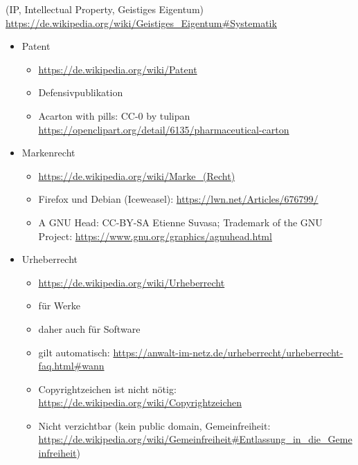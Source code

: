 {
	(IP, Intellectual Property, Geistiges Eigentum) \url{https://de.wikipedia.org/wiki/Geistiges\_Eigentum\#Systematik}
	\begin{itemize}
		\item Patent
		\begin{itemize}
			\item \url{https://de.wikipedia.org/wiki/Patent}
			\item Defensivpublikation
			\item Acarton with pills: CC-0 by tulipan \url{https://openclipart.org/detail/6135/pharmaceutical-carton}
		\end{itemize}
		\item Markenrecht
		\begin{itemize}
			\item \url{https://de.wikipedia.org/wiki/Marke_(Recht)}
			\item Firefox und Debian (Iceweasel): \url{https://lwn.net/Articles/676799/}
			\item A GNU Head: CC-BY-SA Etienne Suvasa; Trademark of the GNU Project: \url{https://www.gnu.org/graphics/agnuhead.html}
		\end{itemize}
		\item Urheberrecht
		\begin{itemize}
			\item \url{https://de.wikipedia.org/wiki/Urheberrecht}
			\item für Werke
			\item daher auch für Software
			\item gilt automatisch: \url{https://anwalt-im-netz.de/urheberrecht/urheberrecht-faq.html\#wann}
			\item Copyrightzeichen ist nicht nötig: \url{https://de.wikipedia.org/wiki/Copyrightzeichen}
			\item Nicht verzichtbar (kein public domain, Gemeinfreiheit: \url{https://de.wikipedia.org/wiki/Gemeinfreiheit\#Entlassung\_in\_die\_Gemeinfreiheit})
		\end{itemize}
	\end{itemize}
}
